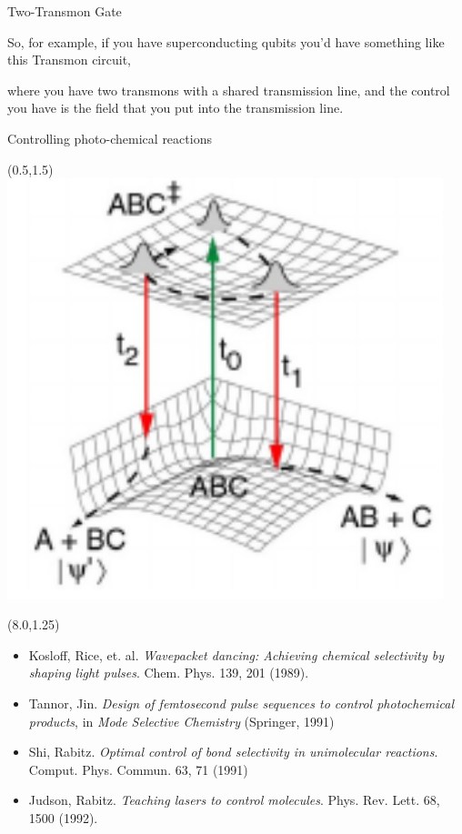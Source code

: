\documentclass[compress, aspectratio=169]{beamer}
\begin{document}
\begin{frame}{Two-Transmon Gate}
{    So, for example, if you have superconducting qubits you'd have something like this Transmon circuit,

    where you have two transmons with a shared transmission line, and the control you have is the field that you put into the transmission line.
  }
\end{frame}


\begin{frame}{Controlling photo-chemical reactions}
 \begin{textblock}{7.5}(0.5,1.5)
   \includegraphics[width=0.95\textwidth]{images/tannor_rice_scheme}
 \end{textblock}
 \begin{textblock}{7.5}(8.0,1.25)
   \begin{itemize}
     \item Kosloff, Rice, et. al. \textit{Wavepacket dancing: Achieving chemical selectivity by shaping light pulses}. Chem. Phys. 139, 201 (1989).
     \item Tannor, Jin. \textit{Design of femtosecond pulse sequences to control photochemical products}, in \textit{Mode Selective Chemistry} (Springer, 1991)
     \item Shi, Rabitz. \textit{Optimal control of bond selectivity in unimolecular reactions}. Comput. Phys. Commun. 63, 71 (1991)
     \item Judson, Rabitz. \textit{Teaching lasers to control molecules}. Phys. Rev. Lett. 68, 1500 (1992).
   \end{itemize}
 \end{textblock}
\end{frame}
\end{document}
